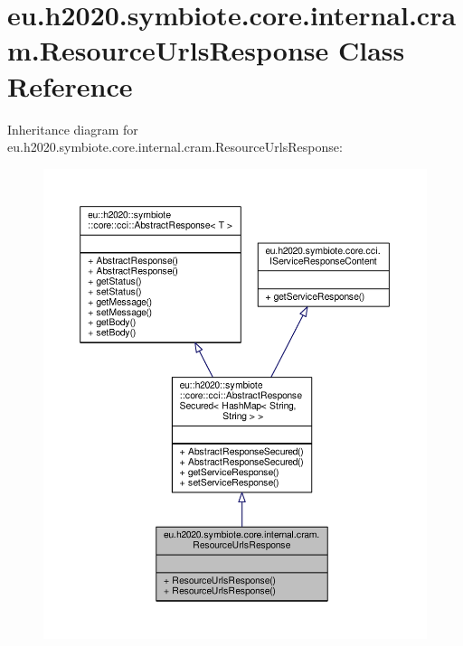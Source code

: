\hypertarget{classeu_1_1h2020_1_1symbiote_1_1core_1_1internal_1_1cram_1_1ResourceUrlsResponse}{}\section{eu.\+h2020.\+symbiote.\+core.\+internal.\+cram.\+Resource\+Urls\+Response Class Reference}
\label{classeu_1_1h2020_1_1symbiote_1_1core_1_1internal_1_1cram_1_1ResourceUrlsResponse}


Inheritance diagram for eu.\+h2020.\+symbiote.\+core.\+internal.\+cram.\+Resource\+Urls\+Response\+:\nopagebreak
\begin{figure}[H]
\begin{center}
\leavevmode
\includegraphics[width=350pt]{classeu_1_1h2020_1_1symbiote_1_1core_1_1internal_1_1cram_1_1ResourceUrlsResponse__inherit__graph}
\end{center}
\end{figure}


